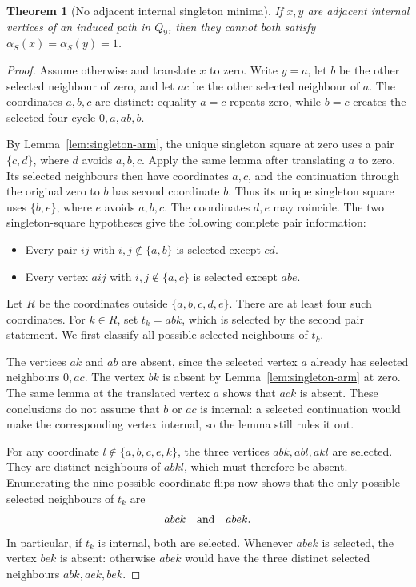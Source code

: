 \documentclass[11pt,a4paper]{article}
\newtheorem{theorem}{Theorem}[section]
\theoremstyle{definition}
\theoremstyle{remark}
\newcommand{\Q}{Q}
\begin{document}
\begin{theorem}[No adjacent internal singleton minima]\label{thm:no-adjacent-singletons}
If $x,y$ are adjacent internal vertices of an induced path in $\Q_9$, then they cannot both satisfy $\alpha_S(x)=\alpha_S(y)=1$.
\end{theorem}
\begin{proof}
Assume otherwise and translate $x$ to zero. Write $y=a$, let $b$ be the other selected neighbour of zero, and let $ac$ be the other selected neighbour of $a$. The coordinates $a,b,c$ are distinct: equality $a=c$ repeats zero, while $b=c$ creates the selected four-cycle $0,a,ab,b$.

By Lemma~\ref{lem:singleton-arm}, the unique singleton square at zero uses a pair $\{c,d\}$, where $d$ avoids $a,b,c$. Apply the same lemma after translating $a$ to zero. Its selected neighbours then have coordinates $a,c$, and the continuation through the original zero to $b$ has second coordinate $b$. Thus its unique singleton square uses $\{b,e\}$, where $e$ avoids $a,b,c$. The coordinates $d,e$ may coincide. The two singleton-square hypotheses give the following complete pair information:
\begin{itemize}
\item Every pair $ij$ with $i,j\notin\{a,b\}$ is selected except $cd$.
\item Every vertex $aij$ with $i,j\notin\{a,c\}$ is selected except $abe$.
\end{itemize}

Let $R$ be the coordinates outside $\{a,b,c,d,e\}$. There are at least four such coordinates. For $k\in R$, set $t_k=abk$, which is selected by the second pair statement. We first classify all possible selected neighbours of $t_k$.

The vertices $ak$ and $ab$ are absent, since the selected vertex $a$ already has selected neighbours $0,ac$. The vertex $bk$ is absent by Lemma~\ref{lem:singleton-arm} at zero. The same lemma at the translated vertex $a$ shows that $ack$ is absent. These conclusions do not assume that $b$ or $ac$ is internal: a selected continuation would make the corresponding vertex internal, so the lemma still rules it out.

For any coordinate $l\notin\{a,b,c,e,k\}$, the three vertices $abk,abl,akl$ are selected. They are distinct neighbours of $abkl$, which must therefore be absent. Enumerating the nine possible coordinate flips now shows that the only possible selected neighbours of $t_k$ are
\[
abck\quad\hbox{and}\quad abek.
\]
In particular, if $t_k$ is internal, both are selected. Whenever $abek$ is selected, the vertex $bek$ is absent: otherwise $abek$ would have the three distinct selected neighbours $abk,aek,bek$.


\end{proof}
\end{document}
